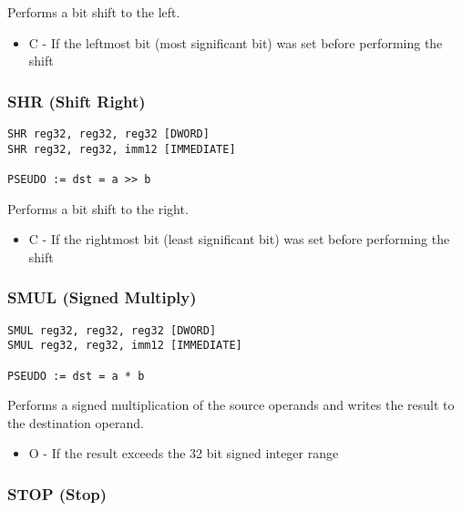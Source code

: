 Performs a bit shift to the left.


\begin{itemize}
        \item   C - If the leftmost bit (most significant bit) was set before performing the shift
\end{itemize}

\subsubsection{SHR (Shift Right)}

\begin{verbatim}
SHR reg32, reg32, reg32 [DWORD]
SHR reg32, reg32, imm12 [IMMEDIATE]

PSEUDO := dst = a >> b
\end{verbatim}


Performs a bit shift to the right.


\begin{itemize}
        \item   C - If the rightmost bit (least significant bit) was set before performing the shift
\end{itemize}

\subsubsection{SMUL (Signed Multiply)}

\begin{verbatim}
SMUL reg32, reg32, reg32 [DWORD]
SMUL reg32, reg32, imm12 [IMMEDIATE]

PSEUDO := dst = a * b
\end{verbatim}


Performs a signed multiplication of the source operands and writes the result to the destination operand.


\begin{itemize}
        \item   O - If the result exceeds the 32 bit signed integer range
\end{itemize}


\subsubsection{STOP (Stop) }

